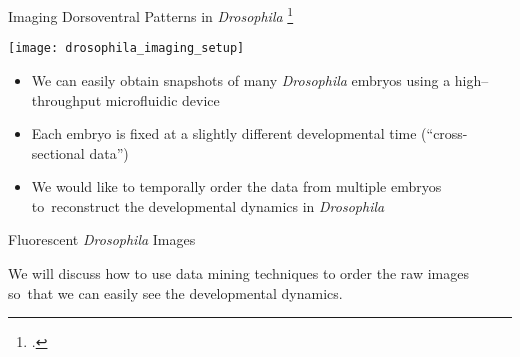 \begin{frame}{Imaging Dorsoventral Patterns in {\em Drosophila} \footcite{chung2010microfluidic}}

	\centering
    \texttt{[image: drosophila\_imaging\_setup]}
    
	\begin{itemize}
        \item We can easily obtain snapshots of many {\em Drosophila} embryos using a high--throughput microfluidic device
        \item Each embryo is fixed at a slightly different developmental time (``cross-sectional data'')
        \item We would like to temporally order the data from multiple embryos to~reconstruct the developmental dynamics in {\em Drosophila}
    \end{itemize}
\end{frame}


\begin{frame}{Fluorescent {\em Drosophila} Images}
	 
	\drawunordered
	
	\drawdownarrow
	
	\drawordereddmaps
	
	We will discuss how to use data mining techniques to order the raw images so~that we can easily see the developmental dynamics.

\end{frame}

